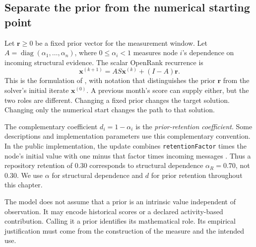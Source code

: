 \subsection{Separate the prior from the numerical starting point}
Let \(\boldsymbol r\geq0\) be a fixed prior vector for the measurement window. Let \(A=\operatorname{diag}(\alpha_1,\ldots,\alpha_n)\), where \(0\leq\alpha_i<1\) measures node \(i\)'s dependence on incoming structural evidence. The scalar OpenRank recurrence is
\begin{equation}
 \boldsymbol x^{(k+1)}
 =AS\boldsymbol x^{(k)}+(I-A)\boldsymbol r.
 \label{eq:ch5-openrank}
\end{equation}
This is the formulation of \citet{han2026rank}, with notation that distinguishes the prior \(\boldsymbol r\) from the solver's initial iterate \(\boldsymbol x^{(0)}\). A previous month's score can supply either, but the two roles are different. Changing a fixed prior changes the target solution. Changing only the numerical start changes the path to that solution.

The complementary coefficient \(d_i=1-\alpha_i\) is the \emph{prior-retention coefficient}. Some descriptions and implementation parameters use this complementary convention. In the public implementation, the update combines \texttt{retentionFactor} times the node's initial value with one minus that factor times incoming messages \citep{openrankgds2023}. Thus a repository retention of \(0.30\) corresponds to structural dependence \(\alpha_R=0.70\), not \(0.30\). We use \(\alpha\) for structural dependence and \(d\) for prior retention throughout this chapter.

The model does not assume that a prior is an intrinsic value independent of observation. It may encode historical scores or a declared activity-based contribution. Calling it a prior identifies its mathematical role. Its empirical justification must come from the construction of the measure and the intended use.

